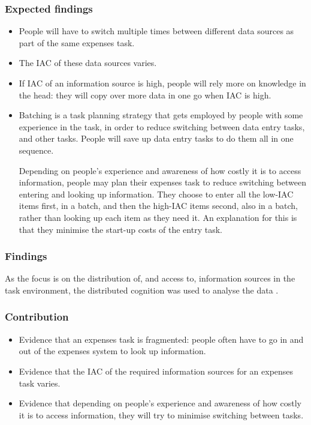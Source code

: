 \subsubsection{Expected findings}
\begin{itemize}
\item
People will have to switch multiple times between different data sources as part of the same expenses task.
\item
The IAC of these data sources varies. 
\item
If IAC of an information source is high, people will rely more on knowledge in the head: they will copy over more data in one go when IAC is high.
\item
Batching is a task planning strategy that gets employed by people with some experience in the task, in order to reduce switching between data entry tasks, and other tasks.  People will save up data entry tasks to do them all in one sequence.

Depending on people's experience and awareness of how costly it is to access information, people may plan their expenses task to reduce switching between entering and looking up information. They choose to enter all the low-IAC items first, in a batch, and then the high-IAC items second, also in a batch, rather than looking up each item as they need it.  An explanation for this is that they minimise the start-up costs of the entry task.

\end{itemize}

\subsubsection{Findings}
As the focus is on the distribution of, and access to, information sources in the task environment, the distributed cognition was used to analyse the data \citep{}. 

\subsubsection{Contribution}
\begin{itemize}
\item
Evidence that an expenses task is fragmented: people often have to go in and out of the expenses system to look up information.    
\item
Evidence that the IAC of the required information sources for an expenses task varies. 
\item
Evidence that depending on people's experience and awareness of how costly it is to access information, they will try to minimise switching between tasks.
\end{itemize}
